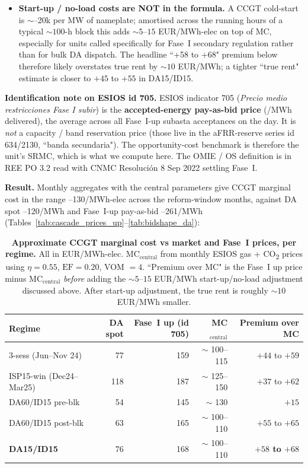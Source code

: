 \documentclass[11pt,a4paper]{article}
\begin{document}
\begin{itemize}
\item \textbf{Start-up / no-load costs are NOT in the formula.} A CCGT cold-start is $\sim$--20k per MW of nameplate; amortised across the running hours of a typical $\sim 100$-h block this adds $\sim 5$--$15$ EUR/MWh-elec on top of MC, especially for units called specifically for Fase~I secondary regulation rather than for bulk DA dispatch. The headline ``+58 to +68" premium below therefore likely overstates true rent by $\sim 10$ EUR/MWh; a tighter ``true rent" estimate is closer to $+45$ to $+55$ in DA15/ID15.
\end{itemize}

\textbf{Identification note on ESIOS id 705.} ESIOS indicator 705 (\emph{Precio medio restricciones Fase I subir}) is the \textbf{accepted-energy pay-as-bid price} (\texteuro/MWh delivered), the average across all Fase~I-up subasta acceptances on the day. It is \emph{not} a capacity / band reservation price (those live in the aFRR-reserve series id 634/2130, ``banda secundaria"). The opportunity-cost benchmark is therefore the unit's SRMC, which is what we compute here. The OMIE / OS definition is in REE PO 3.2 read with CNMC Resolución 8 Sep 2022 settling Fase~I.

\textbf{Result.} Monthly aggregates with the central parameters give CCGT marginal cost in the range --130/MWh-elec across the reform-window months, against DA spot --120/MWh and Fase~I-up pay-as-bid --261/MWh (Tables~\ref{tab:cascade_prices_up}--\ref{tab:bidshape_da}):

\begin{table}[H]
\centering\scriptsize
\caption{\textbf{Approximate CCGT marginal cost vs market and Fase~I prices, per regime.} All in EUR/MWh-elec. MC$_{\text{central}}$ from monthly ESIOS gas + CO\textsubscript{2} prices using $\eta = 0.55$, $\mathrm{EF} = 0.20$, VOM $= 4$. ``Premium over MC" is the Fase~I up price minus MC$_{\text{central}}$ \emph{before} adding the $\sim 5$--$15$ EUR/MWh start-up/no-load adjustment discussed above. After start-up adjustment, the true rent is roughly $\sim 10$ EUR/MWh smaller.}
\label{tab:mc_ccgt_premium}
\setlength{\tabcolsep}{5pt}
\begin{tabular}{l r r r r}
\toprule
Regime                    & DA spot & Fase~I up (id 705) & MC$_{\text{central}}$ & Premium over MC \\
\midrule
3-sess (Jun--Nov 24)      &  77    & 159   & $\sim$ 100--115 & $+44$ to $+59$ \\
ISP15-win (Dec24--Mar25)  & 118    & 187   & $\sim$ 125--150 & $+37$ to $+62$ \\
DA60/ID15 pre-blk         &  54    & 145   & $\sim$ 130     & $+15$ \\
DA60/ID15 post-blk        &  63    & 165   & $\sim$ 100--110 & $+55$ to $+65$ \\
\textbf{DA15/ID15}        &  76    & 168   & $\sim$ 100--110 & \textbf{$+58$ to $+68$} \\
\bottomrule
\end{tabular}
\end{table}
\end{document}
